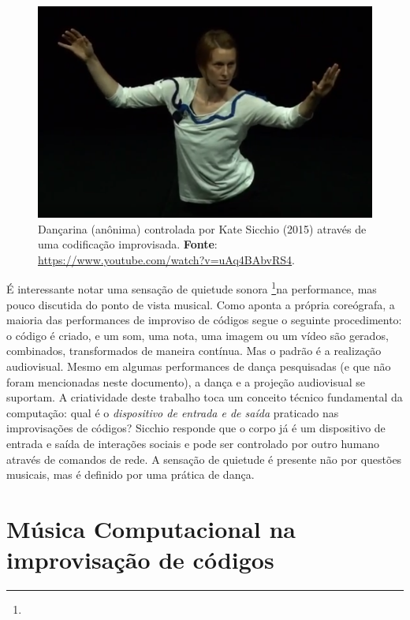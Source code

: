 \begin{figure}[!h]
  \centering
  \includegraphics[scale=0.6]{imagens/iclcdanca.png}
  \caption{Dançarina (anônima) controlada por Kate Sicchio (2015) através de uma codificação improvisada. \textbf{Fonte}: \url{https://www.youtube.com/watch?v=uAq4BAbvRS4}.}
  \label{fig:iclcdanca}
\end{figure}

É interessante notar uma sensação de quietude sonora \footnote{}na performance, mas pouco discutida do ponto de vista musical. Como aponta a própria coreógrafa, a maioria das performances de improviso de códigos segue o seguinte procedimento: o código é criado, e um som, uma nota, uma imagem ou um vídeo são gerados, combinados, transformados de maneira contínua. Mas o padrão é a realização audiovisual. Mesmo em algumas performances de dança pesquisadas (e que não foram mencionadas neste documento), a dança e a projeção audiovisual se suportam. A criatividade deste trabalho toca um conceito técnico fundamental da computação: qual é o \emph{dispositivo de entrada e de saída} praticado nas improvisações de códigos? Sicchio responde que o corpo já é um dispositivo de entrada e saída de interações sociais e pode ser controlado por outro humano através de comandos de rede. A sensação de quietude é presente não por questões musicais, mas é definido por uma prática de dança.


\section{Música Computacional na improvisação de códigos}\label{sec:musica}

